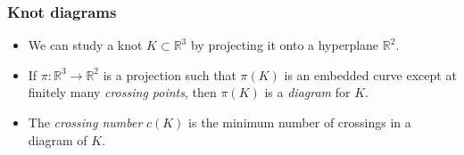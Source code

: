 \documentclass{beamer}
\theoremstyle{ex}
\theoremstyle{rem}
\begin{document}
	\begin{frame}
		\frametitle{Knot diagrams}
		\begin{itemize}
			\item We can study a knot $K\subset\mathbb{R}^3$ by projecting it onto a hyperplane $\mathbb{R}^2$.
			
			\item If $\pi\!:\mathbb{R}^3\to\mathbb{R}^2$ is a projection such that $\pi(K)$ is an embedded curve except at finitely many \textit{crossing points}, then $\pi(K)$ is a \textit{diagram} for $K$.
			
			\item The \textit{crossing number} $c(K)$ is the minimum number of crossings in a diagram of $K$.
	
		\end{itemize}
	

\end{frame}
\end{document}
